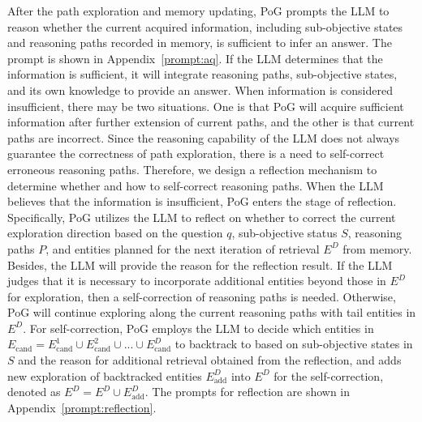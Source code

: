 \documentclass{article}
\begin{document}
After the path exploration and memory updating, PoG prompts the LLM to reason whether the current acquired information, including sub-objective states and reasoning paths recorded in memory, is sufficient to infer an answer. 
The prompt is shown in Appendix~\ref{prompt:aq}.
If the LLM determines that the information is sufficient, it will integrate reasoning paths, sub-objective states, and its own knowledge to provide an answer.
When information is considered insufficient, there may be two situations. One is that PoG will acquire sufficient information after further extension of current paths, and the other is that current paths are incorrect.
Since the reasoning capability of the LLM does not always guarantee the correctness of path exploration, there is a need to self-correct erroneous reasoning paths. 
Therefore, we design a reflection mechanism to determine whether and how to self-correct reasoning paths.
When the LLM believes that the information is insufficient, PoG enters the stage of reflection.
Specifically, PoG utilizes the LLM to reflect on whether to correct the current exploration direction based on the question $q$, sub-objective status $S$, reasoning paths $P$, and entities planned for the next iteration of retrieval $E^D$ from memory. Besides, the LLM will provide the reason for the reflection result.
If the LLM judges that it is necessary to incorporate additional entities beyond those in $E^D$ for exploration, then a self-correction of reasoning paths is needed. Otherwise, PoG will continue exploring along the current reasoning paths with tail entities in $E^D$.
For self-correction, PoG employs the LLM to decide which entities in \(E_{\text{cand}} = E_{\text{cand}}^{1} \cup E_{\text{cand}}^2 \cup ... \cup E_{\text{cand}}^D\) to backtrack to based on sub-objective states in $S$ and the reason for additional retrieval obtained from the reflection, and adds new exploration of backtracked entities \(E_{\text{add}}^D\) into \(E^D\) for the self-correction, denoted as \(E^D= E^D \cup E_{\text{add}}^D\).
 The prompts for reflection are shown in Appendix~\ref{prompt:reflection}.
\end{document}

